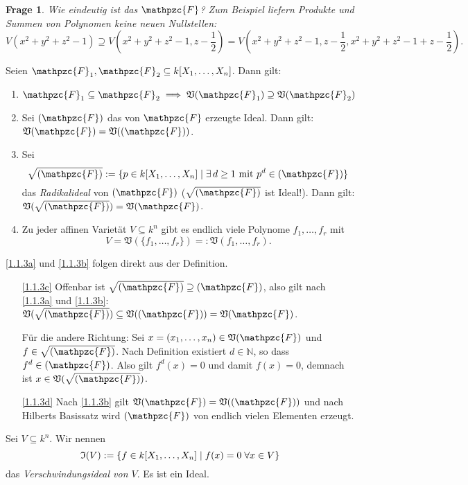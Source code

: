 \documentclass[a4paper,12pt]{scrbook}
\makeatletter
\theoremstyle{blah}
\newtheorem*{q}{Frage}
\theoremstyle{stz}
\renewcommand{\proofname}{Beweis}
\renewenvironment{proof}[1][\proofname]{\par
  \pushQED{\qed}%
  \normalfont \topsep6\p@\@plus6\p@\relax
  \trivlist
  \item[\hskip\labelsep
        \itshape
    #1\@addpunct{:}]\ignorespaces
}{%
  \popQED\endtrivlist\@endpefalse
}
\def\V{\mathfrak{V}}
\def\I{\mathfrak{I}}
\newcommand{\F}{\mathpzc{F}}
\newcommand{\set}[1]{\ensuremath{\mathbb{#1}}}
\newcommand{\N}{\set{N}}
\newcommand{\polyx}[1][n]{\ensuremath%
  [X_{1},\dotsc,X_{#1}]}
\makeatother
\begin{document}
\begin{q}Wie eindeutig ist das $\F$? Zum Beispiel liefern Produkte und Summen von Polynomen keine neuen Nullstellen:
\[V(x^{2}+y^{2}+z^{2}-1) \supseteq V(x^{2}+y^{2}+z^{2}-1, z-\frac{1}{2}) = V(x^{2}+y^{2}+z^{2}-1, z-\frac{1}{2}, x^{2}+y^{2}+z^{2}-1 + z-\frac{1}{2}).\]
\end{q}

\begin{bem} Seien $\F_{1},\F_{2}\subseteq k\polyx$. Dann gilt:
\begin{enumerate}
\item\label{1.1.3a} $\F_{1}\subseteq\F_{2}\implies \V(\F_{1})\supseteq \V(\F_{2})$
\item\label{1.1.3b} Sei $(\F)$ das von $\F$ erzeugte Ideal. Dann gilt: $\V(\F) = \V((\F))$.
\item\label{1.1.3c} Sei
\[\sqrt{(\F)}:=\{p\in k\polyx\mid\exists\, d\geq 1\text{ mit }p^{d}\in(\F)\}\]
das \emph{Radikalideal} von $(\F)$ ($\sqrt{(\F)}$ ist Ideal!). Dann gilt: $\V(\sqrt{(\F)})=\V(\F)$.
\item\label{1.1.3d} Zu jeder affinen Varietät $V\subseteq k^{n}$ gibt es endlich viele Polynome $f_{1},\dotsc,f_{r}$ mit \[V=\V(\{f_{1},\dotsc,f_{r}\})=:\V(f_{1},\dotsc,f_{r}).\]
\end{enumerate}
\end{bem}

\begin{proof}
\ref{1.1.3a} und \ref{1.1.3b} folgen direkt aus der Definition.
\begin{enumerate}%
\item[\ref{1.1.3c}] Offenbar ist $\sqrt{(\F)}\supseteq(\F)$, also gilt nach \ref{1.1.3a} und \ref{1.1.3b}: $\V(\sqrt{(\F)})\subseteq \V((\F))=\V(\F)$.

Für die andere Richtung: Sei $x=(x_{1},\dotsc,x_{n})\in \V(\F)$ und $f\in\sqrt{(\F)}$. Nach Definition existiert $d\in\N$, so dass $f^{d}\in(\F)$. Also gilt $f^{d}(x)=0$ und damit $f(x)=0$, demnach ist $x\in \V(\sqrt{(\F)})$.
\item[\ref{1.1.3d}] Nach \ref{1.1.3b} gilt $\V(\F)=\V((\F))$ und nach Hilberts Basissatz wird $(\F)$ von endlich vielen Elementen erzeugt.\qedhere
\end{enumerate}
\end{proof}

\begin{db}
Sei $V\subseteq k^{n}$. Wir nennen
\[\I(V):=\{f\in k\polyx\mid f(x)=0\;\forall x\in V\}\]
das \emph{Verschwindungsideal von $V$}. Es ist ein Ideal.
\end{db}
\end{document}
